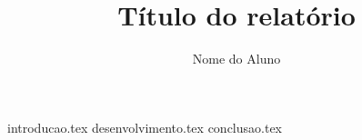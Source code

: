 \documentclass{relatorioUTFPR}
\author{Nome do Aluno}
\title{Título do relatório}
\begin{document}


{introducao.tex}
{desenvolvimento.tex}
{conclusao.tex}


 
\end{document}
